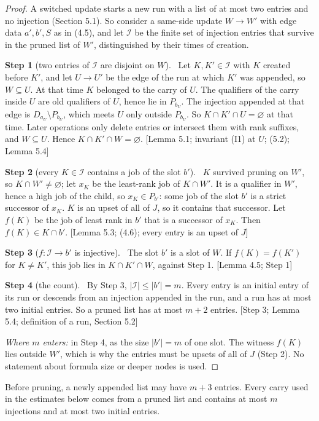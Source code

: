\documentclass[11pt,a4paper]{article}
\theoremstyle{plain}
\theoremstyle{definition}
\newcommand{\step}[2]{\par\smallskip\noindent\textbf{Step #1} (#2).\ \ignorespaces}
\newcommand{\by}[1]{{\small[#1]}}
\begin{document}
\begin{proof}
A switched update starts a new run with a list of at most two entries and no injection (Section 5.1). So consider a
same-side update $W\to W'$ with edge data $a',b',S$ as in (4.5), and let $\mathscr I$ be the finite set of injection
entries that survive in the pruned list of $W'$, distinguished by their times of creation.
\step{1}{two entries of $\mathscr I$ are disjoint on $W$} Let $K,K'\in\mathscr I$ with $K$ created before $K'$, and
let $U\to U'$ be the edge of the run at which $K'$ was appended, so $W\subseteq U$. At that time $K$ belonged to the
carry of $U$. The qualifiers of the carry inside $U$ are old qualifiers of $U$, hence lie in $P_{b_U}$. The injection
appended at that edge is $D_{a_U}\setminus P_{b_U}$, which meets $U$ only outside $P_{b_U}$. So $K\cap K'\cap
U=\varnothing$ at that time. Later operations only delete entries or intersect them with rank suffixes, and
$W\subseteq U$. Hence $K\cap K'\cap W=\varnothing$. \by{Lemma 5.1; invariant (I1) at $U$; (5.2); Lemma 5.4}
\step{2}{every $K\in\mathscr I$ contains a job of the slot $b'$} $K$ survived pruning on $W'$, so $K\cap
W'\neq\varnothing$; let $x_K$ be the least-rank job of $K\cap W'$. It is a qualifier in $W'$, hence a high job of the child, so
$x_K\in P_{b'}$: some job of the slot $b'$ is a strict successor of $x_K$. $K$ is an upset of all of $J$, so it
contains that successor. Let $f(K)$ be the job of least rank in $b'$ that is a successor of $x_K$. Then $f(K)\in
K\cap b'$. \by{Lemma 5.3; (4.6); every entry is an upset of $J$}
\step{3}{$f\colon\mathscr I\to b'$ is injective} The slot $b'$ is a slot of $W$. If $f(K)=f(K')$ for $K\neq K'$, this
job lies in $K\cap K'\cap W$, against Step 1. \by{Lemma 4.5; Step 1}
\step{4}{the count} By Step 3, $|\mathscr I|\leq|b'|=m$. Every entry is an initial entry of its run or descends from
an injection appended in the run, and a run has at most two initial entries. So a pruned list has at most $m+2$
entries. \by{Step 3; Lemma 5.4; definition of a run, Section 5.2}

\noindent\emph{Where $m$ enters:} in Step 4, as the size $|b'|=m$ of one slot. The witness $f(K)$ lies outside $W'$,
which is why the entries must be upsets of all of $J$ (Step 2). No statement about formula size or deeper nodes is
used.
\end{proof}

Before pruning, a newly appended list may have \(m+3\) entries. Every carry used in the estimates below comes from a pruned list and contains at most \(m\) injections and at most two initial entries.
\end{document}
